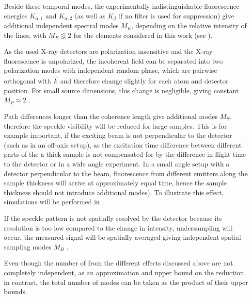 Beside these temporal modes, the experimentally indistinguishable fluorescence energies $K_{\alpha,1}$ and $K_{\alpha,2}$ (as well as  $K_\beta$ if no filter is used for suppression) give additional independent spectral modes $M_E$, depending on the relative intensity of the lines, with $M_E \lessapprox 2$ for the elements considered in this work (see ).

As the used X-ray detectors are polarization insensitive and the X-ray fluorescence is unpolarized, the incoherent field can be separated into two polarization modes with independent random phase, which are pairwise orthogonal with $\vec{k}$ and therefore change slightly for each atom and detector position. For small source dimensions, this change is negligible,  giving constant $M_P \approx 2$ \cite{classen2019}. 

Path differences longer than the coherence length give additional modes $M_S$, therefore the speckle visibility will be reduced for large samples. This is for example important, if the exciting beam is not perpendicular to the detector (such as in an off-axis setup), as the excitation time difference between different parts of the a thick sample is not compensated for by the difference in flight time to the detector or in a wide angle experiment. In a small angle setup with a detector perpendicular to the beam, fluorescence from different emitters along the sample thickness will arrive at approximately equal time, hence the sample thickness should not introduce additional modes). To illustrate this effect, simulations will be performed in .

If the speckle pattern is not spatially resolved by the detector because its resolution is too low compared to the change in intensity, undersampling will occur, the measured signal will be spatially averaged giving independent spatial sampling modes $M_D$ \cite{goodman2007}.

Even though the number of from the different effects discussed above are not completely independent, as an approximation and upper bound on the reduction in contrast, the total number of modes can be taken as the product of their upper bounds. 


